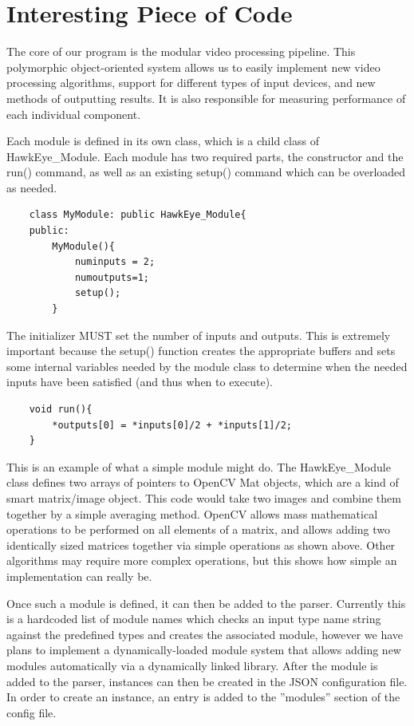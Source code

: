 \documentclass[letterpaper,10pt,titlepage]{IEEEtran}
\begin{document}
   \section{Interesting Piece of Code}
   The core of our program is the modular video processing pipeline. This polymorphic object-oriented system allows us to easily implement new video processing algorithms, support for different types of input devices, and new methods of outputting results. It is also responsible for measuring performance of each individual component.\\
\par
Each module is defined in its own class, which is a child class of HawkEye\_Module. Each module has two required parts, the constructor and the run() command, as well as an existing setup() command which can be overloaded as needed.\\
   \begin{lstlisting}
   	class MyModule: public HawkEye_Module{
	public:
		MyModule(){
			numinputs = 2;
			numoutputs=1;
			setup();
		}  
   \end{lstlisting}
 \par
   The initializer MUST set the number of inputs and outputs. This is extremely important because the setup() function creates the appropriate buffers and sets some internal variables needed by the module class to determine when the needed inputs have been satisfied (and thus when to execute).\\
   \begin{lstlisting}
   	void run(){
		*outputs[0] = *inputs[0]/2 + *inputs[1]/2;
	}
   \end{lstlisting}
 \par
   This is an example of what a simple module might do. The HawkEye\_Module class defines two arrays of pointers to OpenCV Mat objects, which are a kind of smart matrix/image object. This code would take two images and combine them together by a simple averaging method. OpenCV allows mass mathematical operations to be performed on all elements of a matrix, and allows adding two identically sized matrices together via simple operations as shown above. Other algorithms may require more complex operations, but this shows how simple an implementation can really be.\\
\par
Once such a module is defined, it can then be added to the parser. Currently this is a hardcoded list of module names which checks an input type name string against the predefined types and creates the associated module, however we have plans to implement a dynamically-loaded module system that allows adding new modules automatically via a dynamically linked library. After the module is added to the parser, instances can then be created in the JSON configuration file. In order to create an instance, an entry is added to the ''modules'' section of the config file.\\   
\end{document}
